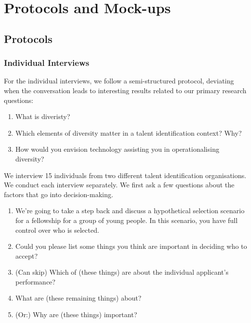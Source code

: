 

\chapter{\label{app:protocolmockup}Protocols and Mock-ups}

\minitoc

\section{Protocols}\label{app:protocol}
\subsection{Individual Interviews} 
For the individual interviews, we follow a semi-structured protocol, deviating when the conversation leads to interesting results related to our primary research questions:

\begin{enumerate}
    \item What is diveristy?
    \item Which elements of diversity matter in a talent identification context? Why?
    \item How would you envision technology assisting you in operationalising diversity?
\end{enumerate}

We interview 15 individuals from two different talent identification organisations. We conduct each interview separately. We first ask a few questions about the factors that go into decision-making.

\begin{enumerate}
    \item We're going to take a step back and discuss a hypothetical selection scenario for a fellowship for a group of young people. In this scenario, you have full control over who is selected.
    \item Could you please list some things you think are important in deciding who to accept?
    \item (Can skip) Which of (these things) are about the individual applicant's performance?
    \item What are (these remaining things) about? 
    \item (Or:) Why are (these things) important?
\end{enumerate}

